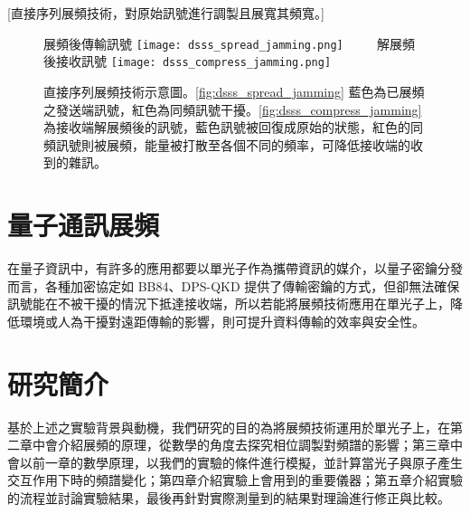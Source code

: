 \documentclass[class=NCU_thesis, crop=false]{standalone}
\begin{document}
[直接序列展頻技術，對原始訊號進行調製且展寬其頻寬。]

\begin{figure}[!hbt]
    \centering
    \subcaptionbox
        {展頻後傳輸訊號
        \label{fig:dsss_spread_jamming}}
        {\texttt{[image: dsss\_spread\_jamming.png]}}
    ~~~~
    \subcaptionbox
        {解展頻後接收訊號
        \label{fig:dsss_compress_jamming}}
        {\texttt{[image: dsss\_compress\_jamming.png]}}
    \caption[直接序列展頻技術示意圖]{直接序列展頻技術示意圖。\cref{fig:dsss_spread_jamming} 藍色為已展頻之發送端訊號，紅色為同頻訊號干擾。\cref{fig:dsss_compress_jamming} 為接收端解展頻後的訊號，藍色訊號被回復成原始的狀態，紅色的同頻訊號則被展頻，能量被打散至各個不同的頻率，可降低接收端的收到的雜訊。}
    \label{fig:dsss}
\end{figure}


\section{量子通訊展頻}
在量子資訊中，有許多的應用都要以單光子作為攜帶資訊的媒介，以量子密鑰分發而言，各種加密協定如 BB84、DPS-QKD 提供了傳輸密鑰的方式，但卻無法確保訊號能在不被干擾的情況下抵達接收端，所以若能將展頻技術應用在單光子上，降低環境或人為干擾對遠距傳輸的影響，則可提升資料傳輸的效率與安全性。

\section{研究簡介}
基於上述之實驗背景與動機，我們研究的目的為將展頻技術運用於單光子上，在第二章中會介紹展頻的原理，從數學的角度去探究相位調製對頻譜的影響；第三章中會以前一章的數學原理，以我們的實驗的條件進行模擬，並計算當光子與原子產生交互作用下時的頻譜變化；第四章介紹實驗上會用到的重要儀器；第五章介紹實驗的流程並討論實驗結果，最後再針對實際測量到的結果對理論進行修正與比較。
\end{document}
